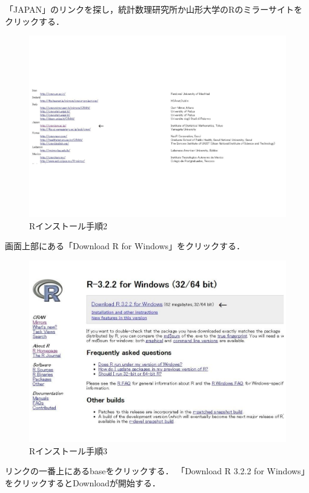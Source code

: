 「JAPAN」のリンクを探し，統計数理研究所か山形大学のRのミラーサイトをクリックする．

\begin{figure}[H]
\centering
\includegraphics[width=13cm]{r1.pdf}
\caption{Rインストール手順2}\label{サンプル図}
\end{figure} 

画面上部にある「Download R for Windows」をクリックする．

\begin{figure}[H]
\centering
\includegraphics[width=13cm]{r2.pdf}
\caption{Rインストール手順3}\label{サンプル図}
\end{figure} 

リンクの一番上にあるbaseをクリックする．
「Download R 3.2.2 for Windows」をクリックするとDownloadが開始する．

